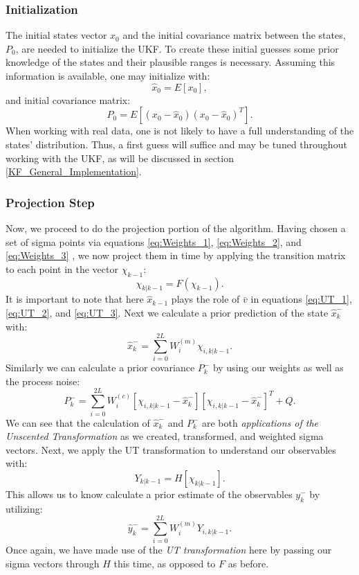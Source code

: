     \subsubsection{Initialization}
    The initial states vector $x_0$ and the initial covariance matrix between the states, $P_0$, are needed to initialize the UKF. To create these initial guesses some prior knowledge of the states and their plausible ranges is necessary. Assuming this information is available, one may initialize with:
    \begin{equation}
    \hat{x}_0 = E[x_0],
    \end{equation}
    and initial covariance matrix:
    \begin{equation}
    P_0 = E[(x_0 - \hat{x}_0)(x_0 - \hat{x}_0)^T].
    \end{equation}
    \cite{VanMereChapter}
    When working with real data, one is not likely to have a full understanding of the states' distribution. Thus, a first guess will suffice and may be tuned throughout working with the UKF, as will be discussed in section \ref{KF_General_Implementation}.  
    \subsubsection{Projection Step}
    Now, we proceed to do the projection portion of the algorithm. Having chosen a set of sigma points via equations \ref{eq:Weights_1}, \ref{eq:Weights_2}, and \ref{eq:Weights_3} , we now project them in time by applying the transition matrix to each point in the vector $\chi_{k-1}$:
    \begin{equation}
    \chi_{k|k-1} = F(\chi_{k-1}).
    \end{equation}
    It is important to note that here $\hat{x}_{k-1}$ plays the role of $\bar{v}$ in equations \ref{eq:UT_1}, \ref{eq:UT_2}, and \ref{eq:UT_3}.
    Next we calculate a prior prediction of the state $\hat{x}_k^-$ with:
    \begin{equation}
    \hat{x}_k^- = \sum_{i = 0}^{2L} W_i^{(m)} \chi_{i, k|k-1}.
    \end{equation}
    Similarly we can calculate a prior covariance $P_k^-$ by using our weights as well as the process noise:
    \begin{equation}
    P_k^- = \sum_{i = 0}^{2L} W_i^{(c)} [\chi_{i, k|k-1} - \hat{x}_k^-][\chi_{i, k|k-1} - \hat{x}_k^-]^T + Q.
    \end{equation}
    We can see that the calculation of $\hat{x}_k^-$ and $P_k^-$ are both \emph{applications of the Unscented Transformation} as we created, transformed, and weighted sigma vectors. Next, we apply the UT transformation to understand our observables with:
    \begin{equation}
    Y_{k|k-1} = H[\chi_{k|k-1}].
    \end{equation}
    This allows us to know calculate a prior estimate of the observables $y_k^-$ by utilizing:
    \begin{equation}
    \hat{y}_k^- = \sum_{i=0}^{2L} W_i^{(m)} Y_{i,k|k-1}.
    \end{equation}
     Once again, we have made use of the \emph{UT transformation} here by passing our sigma vectors through $H$ this time, as opposed to $F$ as before.
